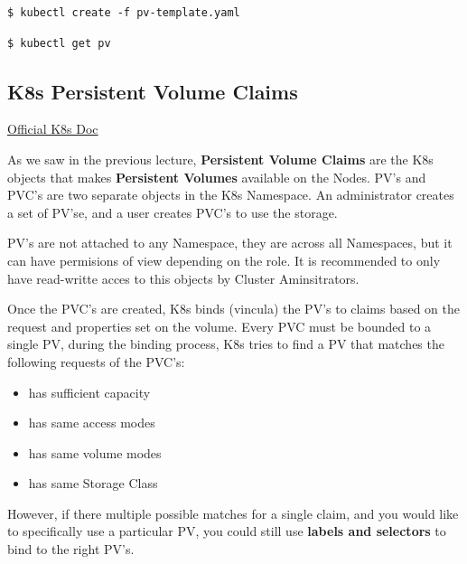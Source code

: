 \documentclass{article}
\newenvironment{blocktemplateIII}[1]{%
    \tcolorbox[beamer,%
    noparskip,breakable,
    ,colframe=Red,%
    colbacklower=LimeGreen!75!LightGreen,%
    title=#1]}%
    {\endtcolorbox}
\newenvironment{codetemplate}[1][]{%
  \mybasecolorbox[#1]
  \itshape
}{%
  \endmybasecolorbox
}
\begin{document}
\begin{codetemplate}{}
\begin{verbatim}
$ kubectl create -f pv-template.yaml
\end{verbatim}
\end{codetemplate}

\begin{codetemplate}{}
\begin{verbatim}
$ kubectl get pv
\end{verbatim}
\end{codetemplate}

\subsection{K8s Persistent Volume Claims}

\href{https://kubernetes.io/docs/concepts/storage/persistent-volumes/#persistentvolumeclaims}{Official K8s Doc}

As we saw in the previous lecture, \textbf{Persistent Volume Claims} are the K8s objects that makes \textbf{Persistent Volumes} available on the Nodes. PV's and PVC's are two separate objects in the K8s Namespace. An administrator creates a set of PV'se, and a user creates PVC's to use the storage.

\begin{blocktemplateIII}{WARNING}
PV's are not attached to any Namespace, they are across all Namespaces, but it can have permisions of view depending on the role. It is recommended to only have read-writte acces to this objects by Cluster Aminsitrators.
\end{blocktemplateIII}

Once the PVC's are created, K8s binds (vincula) the PV's to claims based on the request and properties set on the volume. Every PVC must be bounded to a single PV, during the binding process, K8s tries to find a PV that matches the following requests of the PVC's:

\begin{itemize}
    \item has sufficient capacity
    \item has same access modes
    \item has same volume modes
    \item has same Storage Class
\end{itemize}

However, if there multiple possible matches for a single claim, and you would like to specifically use a particular PV, you could still use \textbf{labels and selectors} to bind to the right PV's.
\end{document}
